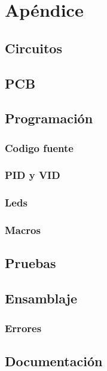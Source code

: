 \chapter{Apéndice}

\section{Circuitos} \label{ApendiceDiseñoEsquematico}


\section{\gls{PCB}} \label{ApendicePCB}

\section{Programación}
\subsection{Codigo fuente} \label{ApendiceCodigoFuente}
\subsection{\gls{PID} y \gls{VID}} \label{ApendicePIDVID}
\subsection{Leds} \label{ApendiceLeds}
\subsection{Macros} \label{ApendiceMacros}

\section{Pruebas} \label{ApendicePruebas}

\section{Ensamblaje} \label{ApendiceEnsamblaje}
\subsection{Errores} \label{ApendiceEnsamblajeErrores}

\section{Documentación} \label{ApendiceDocumentacion}

